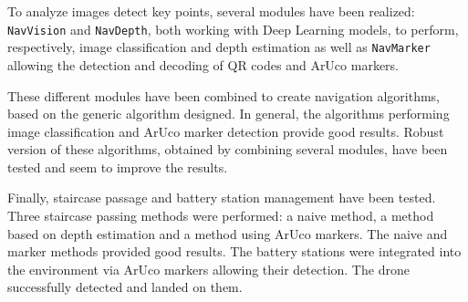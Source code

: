 To analyze images detect key points, several modules have been realized: \texttt{NavVision} and \texttt{NavDepth}, both working with Deep Learning models, to perform, respectively, image classification and depth estimation as well as \texttt{NavMarker} allowing the detection and decoding of QR codes and ArUco markers.

These different modules have been combined to create navigation algorithms, based on the generic algorithm designed. In general, the algorithms performing image classification and ArUco marker detection provide good results. Robust version of these algorithms, obtained by combining several modules, have been tested and seem to improve the results.

Finally, staircase passage and battery station management have been tested. Three staircase passing methods were performed: a naive method, a method based on depth estimation and a method using ArUco markers. The naive and marker methods provided good results. The battery stations were integrated into the environment via ArUco markers allowing their detection. The drone successfully detected and landed on them.
